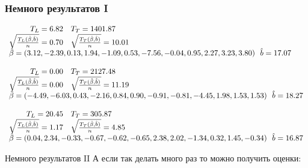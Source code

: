 \documentclass[14pt, fleqn, xcolor={dvipsnames, table}, hyperref={unicode}, babel={english,russian}, inputenc=utf8x]{beamer}
\begin{document}
\begin{frame}[t]\frametitle{Немного результатов I}
\scriptsize
$$\begin{array}{rl}
T_L= 6.82 & T_T = 1401.87 \\ 
\sqrt{\frac{T_L(\hat{\beta}, \hat{b})}{n}} = 0.70 & \sqrt{\frac{T_T(\hat{\beta}, \hat{b})}{n}} = 10.01 \\ 
\multicolumn{2}{l}{\hat{\beta} = (3.12, -2.39, 0.13, 1.94, -1.09, 0.53, -7.56, -0.04, 0.95, 2.27, 3.23, 3.80)~~\hat{b} = 17.07} \\ 
\\ 
T_L= 0.00 & T_T = 2127.48 \\ 
\sqrt{\frac{T_L(\hat{\beta}, \hat{b})}{n}} = 0.00 & \sqrt{\frac{T_T(\hat{\beta}, \hat{b})}{n}} = 11.19 \\ 
\multicolumn{2}{l}{\hat{\beta} = (-4.49, -6.03, 0.43, -2.16, 0.84, 0.90, -0.91, -0.81, -4.45, 1.98, 1.53, 1.53)~~\hat{b} = 18.27} \\ 
\\ 
T_L= 20.45 & T_T = 305.87 \\ 
\sqrt{\frac{T_L(\hat{\beta}, \hat{b})}{n}} = 1.17 & \sqrt{\frac{T_T(\hat{\beta}, \hat{b})}{n}} = 4.85 \\ 
\multicolumn{2}{l}{\hat{\beta} = (0.04, 2.34, -0.33, -0.67, -0.62, -0.65, 2.38, 2.02, -1.34, 0.32, 1.45, -0.34)~~\hat{b} = 16.87} \\ 
\end{array}$$
\end{frame}

\begin{frame}{Немного результатов II}
А если так делать много раз то можно получить оценки:
\scriptsize
{}
\end{frame}
\end{document}
